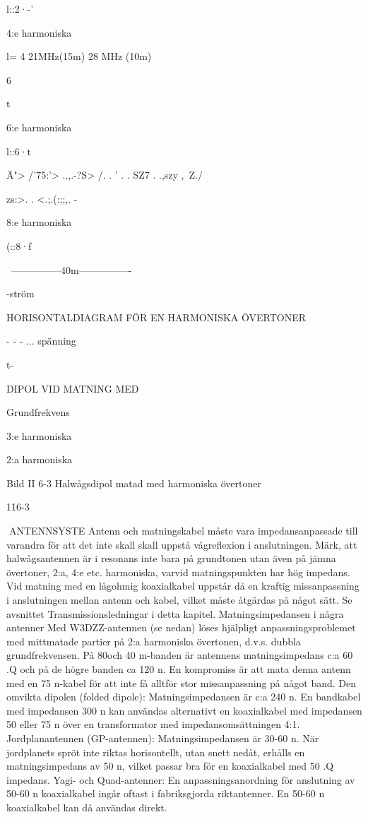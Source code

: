 \documentclass[a4paper,twoside,twocolumn,openright]{book}
\begin{document}
{{{{{l::2·-'}

4:e harmoniska

l= 4
21MHz(15m)
28 MHz (10m)

6

t

6:e harmoniska

l::6·t

Ä"> /'75:'> ..,.-?S> /. .
' . . SZ7 . .,szy ,\ Z./

zs:>. . <.;.(:;;,. -

8:e harmoniska

(::8·f

~---------------40m----------------~

-ström

HORISONTALDIAGRAM FÖR EN
HARMONISKA ÖVERTONER

- - - ... spänning

t-

DIPOL VID MATNING MED

Grundfrekvens

3:e harmoniska

2:a harmoniska

Bild II 6-3 Halwågsdipol matad med harmoniska övertoner

116-3

ANTENNSYSTE
Antenn och matningskabel måste vara
impedansanpassade till varandra för att det
inte skall skall uppstå vågreflexion i anslutningen.
Märk, att halwågsantennen är i resonans inte bara på grundtonen utan även på
jämna övertoner, 2:a, 4:e etc. harmoniska,
varvid matningspunkten har hög impedans.
Vid matning med en lågohmig koaxialkabel
uppstår då en kraftig missanpassning i anslutningen mellan antenn och kabel, vilket
måste åtgärdas på något sätt. Se avsnittet
Transmissionsledningar i detta kapitel.
Matningsimpedansen i några antenner
Med W3DZZ-antennen (se nedan) löses
hjälpligt anpassningsproblemet med mittmatade partier på 2:a harmoniska övertonen, d.v.s. dubbla grundfrekvensen. På 80och 40 m-banden är antennens matningsimpedans c:a 60 .Q och på de högre banden
ca 120 n. En kompromiss är att mata denna
antenn med en 75 n-kabel för att inte få
alltför stor missanpassning på något band.
Den omvikta dipolen (folded dipole):
Matningsimpedansen är c:a 240 n. En
bandkabel med impedansen 300 n kan användas alternativt en koaxialkabel med
impedansen 50 eller 75 n över en transformator med impedansomsättningen 4:1.
Jordplanantennen (GP-antennen):
Matningsimpedansen är 30-60 n. När
jordplanets spröt inte riktas horisontellt, utan
snett nedåt, erhålls en matningsimpedans
av 50 n, vilket passar bra för en koaxialkabel med 50 .Q impedans.
Yagi- och Quad-antenner:
En anpassningsanordning för anslutning
av 50-60 n koaxialkabel ingår oftast i fabriksgjorda riktantenner. En 50-60 n koaxialkabel kan då användas direkt.

}}}}
\end{document}
